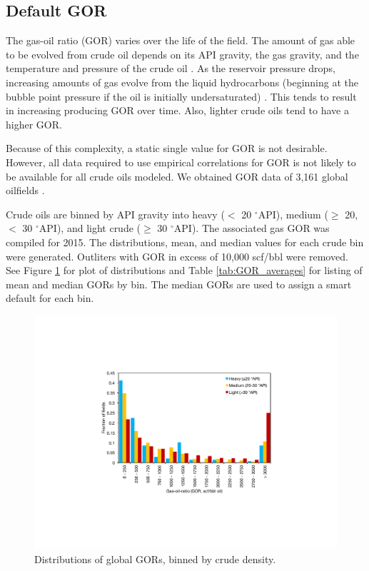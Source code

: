 \documentclass[11pt]{report}
\begin{document}
\subsection{Default GOR} \label{sec:GOR_default}

The gas-oil ratio (GOR) varies over the life of the field. The amount of gas able to be evolved from crude oil depends on its API gravity, the gas gravity, and the temperature and pressure of the crude oil \cite[p. 297]{Mccain1990}. As the reservoir pressure drops, increasing amounts of gas evolve from the liquid hydrocarbons (beginning at the bubble point pressure if the oil is initially undersaturated) \cite{Mccain1990}. This tends to result in increasing producing GOR over time. Also, lighter crude oils tend to have a higher GOR. 

Because of this complexity, a static single value for GOR is not desirable. However, all data required to use empirical correlations for GOR is not likely to be available for all crude oils modeled. We obtained GOR data of 3,161 global oilfields \cite{masnadi2018global}. 

Crude oils are binned by API gravity into heavy ($<$ 20 $^\circ$API), medium ($\geq$ 20, $<$ 30 $^\circ$API), and light crude ($\geq$ 30 $^\circ$API). The associated gas GOR was compiled for 2015. The distributions, mean, and median values for each crude bin were generated. Outliters with GOR in excess of 10,000 scf/bbl were removed. See Figure \ref{fig:API-GOR} for plot of distributions and Table \ref{tab:GOR_averages} for listing of mean and median GORs by bin. The median GORs are used to assign a smart default for each bin. 

\begin{figure}
\includegraphics[width=0.8\columnwidth]{images/API-GOR.pdf}
\caption{Distributions of global GORs, binned by crude density.}
\label{fig:API-GOR}
\end{figure}
\end{document}

